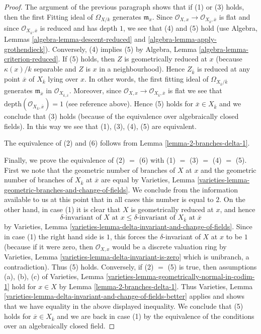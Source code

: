 \documentclass[10pt,a4paper]{amsart}
\theoremstyle{plain}
\theoremstyle{definition}
\theoremstyle{remark}
\numberwithin{equation}{subsection}
\begin{document}
\begin{proof}
\medskip\noindent
The argument of the previous paragraph shows that if (1) or (3) holds, then
the first Fitting ideal of $\Omega_{X/k}$ generates $\mathfrak m_x$.
Since $\mathcal{O}_{X, x} \to \mathcal{O}_{X_{\overline{k}}, \overline{x}}$
is flat and since $\mathcal{O}_{X_{\overline{k}}, \overline{x}}$
is reduced and has depth $1$, we see that (4) and (5) hold
(use Algebra, Lemmas \ref{algebra-lemma-descent-reduced} and
\ref{algebra-lemma-apply-grothendieck}).
Conversely, (4) implies (5) by
Algebra, Lemma \ref{algebra-lemma-criterion-reduced}.
If (5) holds, then $Z$ is geometrically reduced at $x$
(because $\kappa(x)/k$ separable and $Z$ is $x$ in a neighbourhood).
Hence $Z_{\overline{k}}$ is reduced at any point $\overline{x}$
of $X_{\overline{k}}$ lying over $x$. In other words, the first
fitting ideal of $\Omega_{X_{\overline{k}}/\overline{k}}$ generates
$\mathfrak m_{\overline{x}}$ in $\mathcal{O}_{X_{\overline{k}, \overline{x}}}$.
Moreover, since
$\mathcal{O}_{X, x} \to \mathcal{O}_{X_{\overline{k}}, \overline{x}}$ is flat
we see that $\text{depth}(\mathcal{O}_{X_{\overline{k}}, \overline{x}}) = 1$
(see reference above).
Hence (5) holds for $\overline{x} \in X_{\overline{k}}$ and we
conclude that (3) holds (because of the equivalence over algebraically
closed fields). In this way we see that (1), (3), (4), (5)
are equivalent.

\medskip\noindent
The equivalence of (2) and (6) follows from
Lemma \ref{lemma-2-branches-delta-1}.

\medskip\noindent
Finally, we prove the equivalence of (2) $=$ (6) with
(1) $=$ (3) $=$ (4) $=$ (5). First we note that the geometric number
of branches of $X$ at $x$ and the geometric number of branches
of $X_{\overline{k}}$ at $\overline{x}$ are equal by
Varieties, Lemma
\ref{varieties-lemma-geometric-branches-and-change-of-fields}.
We conclude from the information available to us at this point
that in all cases this number is equal to $2$.
On the other hand, in case (1) it is clear that $X$ is geometrically
reduced at $x$, and hence
$$
\delta\text{-invariant of }X\text{ at }x \leq
\delta\text{-invariant of }X_{\overline{k}}\text{ at }\overline{x}
$$
by Varieties, Lemma \ref{varieties-lemma-delta-invariant-and-change-of-fields}.
Since in case (1) the right hand side is $1$, this
forces the $\delta$-invariant of $X$ at $x$ to be $1$
(because if it were zero, then $\mathcal{O}_{X, x}$ would
be a discrete valuation ring by
Varieties, Lemma \ref{varieties-lemma-delta-invariant-is-zero}
which is unibranch, a contradiction). Thus (5) holds.
Conversely, if (2) $=$ (5) is true, then assumptions (a), (b), (c) of
Varieties, Lemma \ref{varieties-lemma-geometrically-normal-in-codim-1}
hold for $x \in X$ by
Lemma \ref{lemma-2-branches-delta-1}. Thus
Varieties, Lemma
\ref{varieties-lemma-delta-invariant-and-change-of-fields-better}
applies and shows that we have equality in the above displayed inequality.
We conclude that (5) holds for $\overline{x} \in X_{\overline{k}}$
and we are back in case (1) by the equivalence of the conditions
over an algebraically closed field.
\end{proof}
\end{document}
